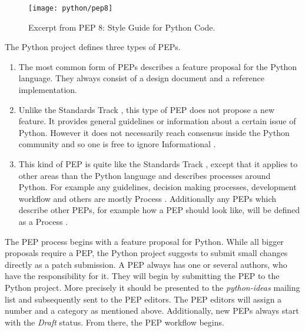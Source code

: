 \begin{figure}[htbp]
  \centering
  \texttt{[image: python/pep8]}
  \caption[Excerpt from \acl{PEP} 8]{Excerpt from \ac{PEP} 8: Style Guide for Python Code.}
\end{figure}

The Python project defines three types of \acp{PEP}.

\begin{enumerate}

  \item {} The most common form of
    \acp{PEP} describes a feature proposal for the Python language. They always
    consist of a design document and a reference implementation.

  \item {} Unlike the Standards Track
    , this type of \ac{PEP} does not propose a new feature. It
    provides general guidelines or information about a certain issue of Python.
    However it does not necessarily reach consensus inside the Python community
    and so one is free to ignore Informational .

  \item {} This kind of \ac{PEP} is quite like
    the Standards Track , except that it applies to other
    areas than the Python language and describes processes around Python. For
    example any guidelines, decision making processes, development workflow and
    others are mostly Process . Additionally any \acp{PEP}
    which describe other \acp{PEP}, for example how a \ac{PEP} should look
    like, will be defined as a Process .

\end{enumerate}

The \ac{PEP} process begins with a feature proposal for Python. While all
bigger proposals require a \ac{PEP}, the Python project suggests to submit
small changes directly as a patch submission. A \ac{PEP} always has one or
several authors, who have the responsibility for it. They will begin by
submitting the \ac{PEP} to the Python project. More precisely it should be
presented to the \emph{python-ideas} mailing list and subsequently sent to the
\ac{PEP} editors. The \ac{PEP} editors will assign a number and a category as
mentioned above. Additionally, new \acp{PEP} always start with the \emph{Draft}
status. From there, the \ac{PEP} workflow begins.

